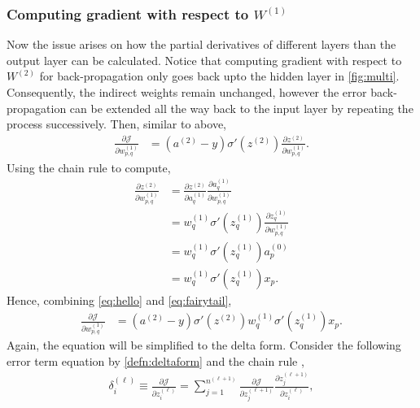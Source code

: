 \subsubsection{Computing gradient with respect to \texorpdfstring{$W^{(1)}$}{W⁽¹⁾}}
Now the issue arises on how the partial derivatives of different layers than the output layer can be calculated. 
Notice that computing gradient with respect to $W^{(2)}$ for back-propagation only goes back upto the hidden layer in \autoref{fig:multi}. Consequently, the indirect weights remain unchanged, however the error back-propagation can be extended all the way back to the input layer by repeating the process successively. Then, similar to above,
\begin{align}
    \frac{\partial \mathcal{J}}{\partial w^{(1)}_{p,q}} 
    &={(a^{(2)}-{y})} \sigma'(z^{(2)}) \frac{\partial z^{(2)}}{\partial w^{(1)}_{p,q}}. \label{eq:fairytail}
\end{align}
Using the chain rule to compute,
\begin{align}
    \frac{\partial z^{(2)}}{\partial w^{(1)}_{p,q}} 
    &= \frac{\partial z^{(2)}}{\partial a^{(1)}_{q}} \frac{\partial a^{(1)}_{q}}{\partial w^{(1)}_{p,q}} \nonumber\\
    &=w_{q}^{(1)}\sigma'(z^{(1)}_q) \frac{\partial z_q^{(1)}}{\partial w^{(1)}_{p,q}} \nonumber \\
    &=w_{q}^{(1)}\sigma'(z^{(1)}_q) a^{(0)}_p \nonumber \\
    &=w_{q}^{(1)}\sigma'(z^{(1)}_q) x_p \label{eq:hello}.
\end{align}
Hence, combining \autoref{eq:hello} and \autoref{eq:fairytail},
\begin{align}
    \frac{\partial \mathcal{J}}{\partial w^{(1)}_{p,q}} &= {(a^{(2)}-{y})} \sigma'(z^{(2)})w_{q}^{(1)}\sigma'(z^{(1)}_q) x_p. \nonumber
\end{align}
Again, the equation will be simplified to the delta form.
Consider the following error term equation by \cref{defn:deltaform} and the chain rule \parencite{artifical},
\begin{align*}
    \delta^{(\ell)}_i \equiv  \frac{\partial \mathcal{J}}{\partial z^{(\ell)}_{i}} 
    = \sum_{j=1}^{n^{(\ell+1)}} 
    \frac{\partial \mathcal{J}}{\partial z^{(\ell+1)}_{j}} 
    \frac{\partial z^{(\ell+1)}_{j}}{\partial z^{(\ell)}_{i}},
\end{align*}
